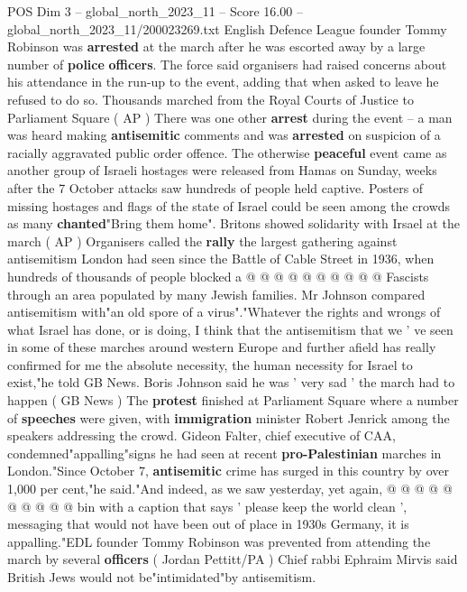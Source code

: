 \begin{textsample}{POS Dim 3 – global\_north\_2023\_11 – Score 16.00 – global\_north\_2023\_11/200023269.txt}  \label{ex:f3_pos_168}
English Defence League founder Tommy Robinson was \textbf{arrested} at the march after he was escorted away by a large number of \textbf{police} \textbf{officers}.
The force said organisers had raised concerns about his attendance in the run-up to the event, adding that when asked to leave he refused to do so.
Thousands marched from the Royal Courts of Justice to Parliament Square ( AP ) There was one other \textbf{arrest} during the event -- a man was heard making \textbf{antisemitic} comments and was \textbf{arrested} on suspicion of a racially aggravated public order offence.
The otherwise \textbf{peaceful} event came as another group of Israeli hostages were released from Hamas on Sunday, weeks after the 7 October attacks saw hundreds of people held captive.
Posters of missing hostages and flags of the state of Israel could be seen among the crowds as many \textbf{chanted}"Bring them home".
Britons showed solidarity with Irsael at the march ( AP ) Organisers called the \textbf{rally} the largest gathering against antisemitism London had seen since the Battle of Cable Street in 1936, when hundreds of thousands of people blocked a @ @ @ @ @ @ @ @ @ @ Fascists through an area populated by many Jewish families.
Mr Johnson compared antisemitism with"an old spore of a virus"."Whatever the rights and wrongs of what Israel has done, or is doing, I think that the antisemitism that we ' ve seen in some of these marches around western Europe and further afield has really confirmed for me the absolute necessity, the human necessity for Israel to exist,"he told GB News.
Boris Johnson said he was ' very sad ' the march had to happen ( GB News ) The \textbf{protest} finished at Parliament Square where a number of \textbf{speeches} were given, with \textbf{immigration} minister Robert Jenrick among the speakers addressing the crowd.
Gideon Falter, chief executive of CAA, condemned"appalling"signs he had seen at recent \textbf{pro-Palestinian} marches in London."Since October 7, \textbf{antisemitic} crime has surged in this country by over 1,000 per cent,"he said."And indeed, as we saw yesterday, yet again, @ @ @ @ @ @ @ @ @ @ bin with a caption that says ' please keep the world clean ', messaging that would not have been out of place in 1930s Germany, it is appalling."EDL founder Tommy Robinson was prevented from attending the march by several \textbf{officers} ( Jordan Pettitt/PA ) Chief rabbi Ephraim Mirvis said British Jews would not be"intimidated"by antisemitism.

\end{textsample}
